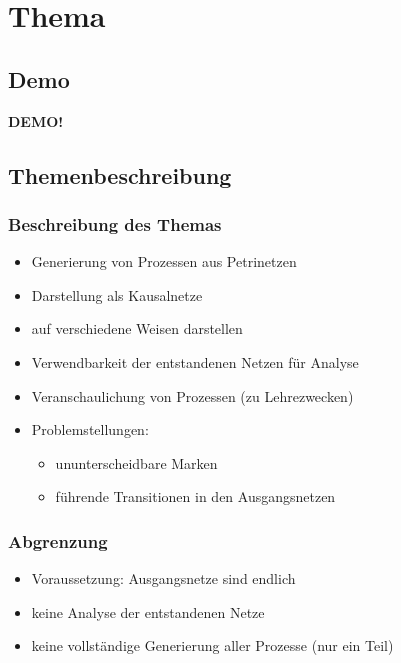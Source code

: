 \section{Thema}
\subsection{Demo}
\begin{frame}
	\begin{center}
		\begin{Huge}
			\textbf{DEMO!}
		\end{Huge}
	\end{center}
\end{frame}

\subsection{Themenbeschreibung}

\begin{frame}
	\frametitle{Beschreibung des Themas}
	
	\begin{itemize}
		\item Generierung von Prozessen aus Petrinetzen
		\item Darstellung als Kausalnetze
		\item auf verschiedene Weisen darstellen
		\item Verwendbarkeit der entstandenen Netzen für Analyse
		\item Veranschaulichung von Prozessen (zu Lehrezwecken)
		\item Problemstellungen:
		\begin{itemize}
			\item ununterscheidbare Marken
			\item führende Transitionen in den Ausgangsnetzen
		\end{itemize}
	\end{itemize}
	
\end{frame}

\begin{frame}
	\frametitle{Abgrenzung}
	
	\begin{itemize}
		\item Voraussetzung: Ausgangsnetze sind endlich
		\item keine Analyse der entstandenen Netze
		\item keine vollständige Generierung aller Prozesse (nur ein Teil)
	\end{itemize}
	
\end{frame}

